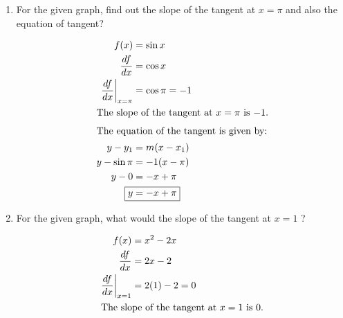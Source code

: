 \BgThispage
\begin{enumerate}
    \item For the given graph, find out the slope of the tangent at $x=\pi$ and also the equation of tangent?
        \begin{center}
        \end{center}
        \begin{solution}
            \begin{align*}
                f(x) &= \sin x\\
                \frac{df}{dx} &= \cos x\\
                \frac{df}{dx}\bigg|_{x=\pi} &= \cos \pi = -1\\
                \intertext{The slope of the tangent at $x=\pi$ is $-1$.}
                \intertext{The equation of the tangent is given by:}
                y - y_1 &= m(x-x_1)\\
                y - \sin \pi &= -1(x-\pi)\\
                y - 0 &= -x + \pi\\
                \Aboxed{y &= -x + \pi}
            \end{align*}
        \end{solution}

    \item For the given graph, what would the slope of the tangent at $x=1$ ?
        \begin{center}
        \end{center}
        \begin{solution}
            \begin{align*}
                f(x) &= x^2 - 2x\\
                \frac{df}{dx} &= 2x - 2\\
                \frac{df}{dx}\bigg|_{x=1} &= 2(1) - 2 = 0\\
                \intertext{The slope of the tangent at $x=1$ is $0$.}
            \end{align*}
        \end{solution}


\end{enumerate}
